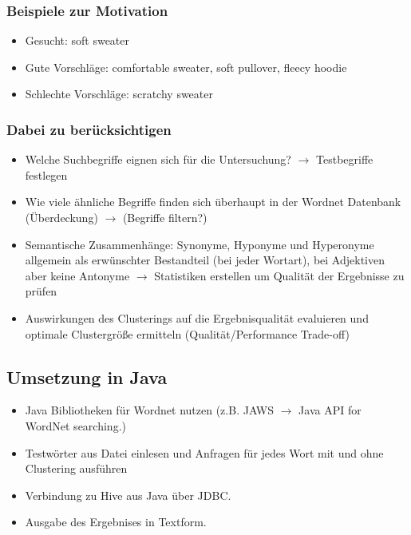 \subsubsection{Beispiele zur Motivation}

\begin{itemize}
\item{Gesucht: soft sweater}
\item{Gute Vorschläge: comfortable sweater, soft pullover, fleecy hoodie}
\item{Schlechte Vorschläge: scratchy sweater}
\end{itemize}

\subsubsection{Dabei zu berücksichtigen}

\begin{itemize}
\item{Welche Suchbegriffe eignen sich für die Untersuchung? $\rightarrow$ Testbegriffe festlegen}
\item{Wie viele ähnliche Begriffe finden sich überhaupt in der Wordnet Datenbank (Überdeckung) $\rightarrow$ (Begriffe filtern?)}
\item{Semantische Zusammenhänge: Synonyme, Hyponyme und Hyperonyme allgemein als erwünschter Bestandteil (bei jeder Wortart), bei Adjektiven aber keine Antonyme $\rightarrow$ Statistiken erstellen um Qualität der Ergebnisse zu prüfen}
\item{Auswirkungen des Clusterings auf die Ergebnisqualität evaluieren und optimale Clustergröße ermitteln (Qualität/Performance Trade-off)}
\end{itemize}

\subsection{Umsetzung in Java}



\begin{itemize}
\item{Java Bibliotheken für Wordnet nutzen (z.B. JAWS $\rightarrow$ Java API for WordNet searching.)}
\item{Testwörter aus Datei einlesen und Anfragen für jedes Wort mit und ohne Clustering ausführen}
\item{Verbindung zu Hive aus Java über JDBC.}
\item{Ausgabe des Ergebnises in Textform.}
\end{itemize}
